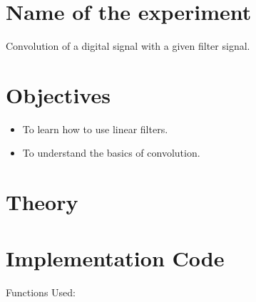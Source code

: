 \documentclass[a4paper,11pt]{article}
\begin{document}
	\section*{Name of the experiment}
	Convolution of a digital signal with a given filter signal.
	\section*{Objectives}
	\begin{itemize}
		\item To learn how to use linear filters. 
		\item To understand the basics of convolution.

	\end{itemize}
	\section*{Theory}
	
		
	
	
	\section*{Implementation Code}  
	\captionsetup{labelformat=empty,labelsep=none}
	
	\vspace{1.5cm}
	\large Functions Used:
	
	
	\vspace{2.7cm}
	
	
	
	
	
\end{document}
